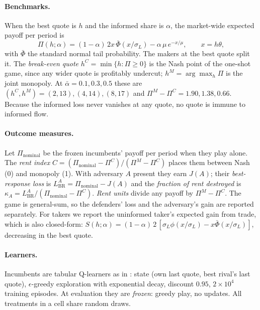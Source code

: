 \documentclass[11pt]{article}
\newcommand{\LBR}{L_{\mathrm{BR}}}
\begin{document}
\paragraph{Benchmarks.} When the best quote is $h$ and the informed share is $\alpha$, the market-wide expected payoff per period is
\[
\Pi(h;\alpha)=(1-\alpha)\,2x\,\bar\Phi(x/\sigma_L)-\alpha\,\mu\,e^{-x/\mu},\qquad x=h\theta ,
\]
with $\bar\Phi$ the standard normal tail probability. The makers at the best quote split it. The \emph{break-even quote} $h^C=\min\{h:\Pi\ge0\}$ is the Nash point of the one-shot game, since any wider quote is profitably undercut; $h^M=\arg\max_h\Pi$ is the joint monopoly. At $\bar\alpha=0.1,0.3,0.5$ these are $(h^C,h^M)=(2,13),(4,14),(8,17)$ and $\Pi^M-\Pi^C=1.90,1.38,0.66$. Because the informed loss never vanishes at any quote, no quote is immune to informed flow.

\paragraph{Outcome measures.} Let $\Pi_{\mathrm{nominal}}$ be the frozen incumbents' payoff per period when they play alone. The \emph{rent index} $C=(\Pi_{\mathrm{nominal}}-\Pi^C)/(\Pi^M-\Pi^C)$ places them between Nash (0) and monopoly (1). With adversary $A$ present they earn $J(A)$; their \emph{best-response loss} is $\LBR^A=\Pi_{\mathrm{nominal}}-J(A)$ and the \emph{fraction of rent destroyed} is $\kappa_A=\LBR^A/(\Pi_{\mathrm{nominal}}-\Pi^C)$. \emph{Rent units} divide any payoff by $\Pi^M-\Pi^C$. The game is general-sum, so the defenders' loss and the adversary's gain are reported separately. For takers we report the uninformed taker's expected gain from trade, which is also closed-form: $S(h;\alpha)=(1-\alpha)\,2\,[\sigma_L\phi(x/\sigma_L)-x\bar\Phi(x/\sigma_L)]$, decreasing in the best quote.

\paragraph{Learners.} Incumbents are tabular Q-learners as in \cite{cfl}: state (own last quote, best rival's last quote), $\epsilon$-greedy exploration with exponential decay, discount $0.95$, $2\times10^4$ training episodes. At evaluation they are \emph{frozen}: greedy play, no updates. All treatments in a cell share random draws.
\end{document}
